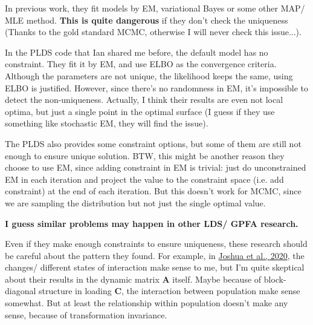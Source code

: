 \documentclass[]{article}
\begin{document}
In previous work, they fit models by EM, variational Bayes or some other MAP/ MLE method. \textbf{This is quite dangerous} if they don't check the uniqueness (Thanks to the gold standard MCMC, otherwise I will never check this issue...). 

In the PLDS code that Ian shared me before, the default model has no constraint. They fit it by EM, and use ELBO as the convergence criteria. Although the parameters are not unique, the likelihood keeps the same, using ELBO is justified. However, since there's no randomness in EM, it's impossible to detect the non-uniqueness. Actually, I think their results are even not local optima, but just a single point in the optimal surface (I guess if they use something like stochastic EM, they will find the issue).  

The PLDS also provides some constraint options, but some of them are still not enough to ensure unique solution. BTW, this might be another reason they choose to use EM, since adding constraint in EM is trivial: just do unconstrained EM in each iteration and project the value to the constraint space (i.e. add constraint) at the end of each iteration. But this doesn't work for MCMC, since we are sampling the distribution but not just the single optimal value.

\textbf{I guess similar problems may happen in other LDS/ GPFA research.}

Even if they make enough constraints to ensure uniqueness, these research should be careful about the pattern they found. For example, in \href{https://papers.nips.cc/paper/2020/hash/aa1f5f73327ba40d47ebce155e785aaf-Abstract.html}{Joshua et al., 2020}, the changes/ different states of interaction make sense to me, but I'm quite skeptical about their results in the dynamic matrix $\mathbf{A}$ itself. Maybe because of block-diagonal structure in loading $\mathbf{C}$, the interaction between population make sense somewhat. But at least the relationship within population doesn't make any sense, because of transformation invariance.

\clearpage
\end{document}
